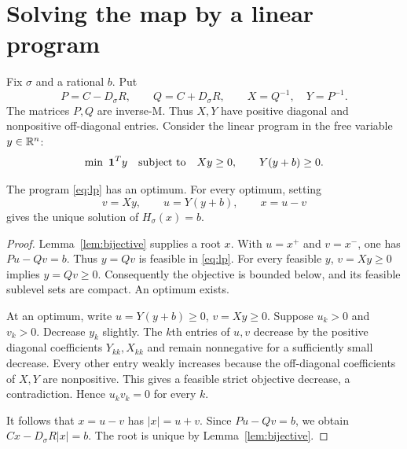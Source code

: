 \section{Solving the map by a linear program}
Fix $\sigma$ and a rational $b$. Put
\[
 P=C-D_\sigma R,\qquad Q=C+D_\sigma R,
 \qquad X=Q^{-1},\quad Y=P^{-1}.
\]
The matrices $P,Q$ are inverse-M. Thus $X,Y$ have positive diagonal and nonpositive off-diagonal entries. Consider the linear program in the free variable $y\in\mathbb R^n$:
\begin{equation}\label{eq:lp}
 \min\ \mathbf 1^Ty
 \quad\text{subject to}\quad Xy\ge0,\qquad Y(y+b)\ge0.
\end{equation}
\begin{lemma}\label{lem:lp}
The program \eqref{eq:lp} has an optimum. For every optimum, setting
\[
 v=Xy,\qquad u=Y(y+b),\qquad x=u-v
\]
gives the unique solution of $H_\sigma(x)=b$.
\end{lemma}
\begin{proof}
Lemma~\ref{lem:bijective} supplies a root $x$. With $u=x^+$ and $v=x^-$, one has $Pu-Qv=b$. Thus $y=Qv$ is feasible in \eqref{eq:lp}. For every feasible $y$, $v=Xy\ge0$ implies $y=Qv\ge0$. Consequently the objective is bounded below, and its feasible sublevel sets are compact. An optimum exists.

At an optimum, write $u=Y(y+b)\ge0$, $v=Xy\ge0$. Suppose $u_k>0$ and $v_k>0$. Decrease $y_k$ slightly. The $k$th entries of $u,v$ decrease by the positive diagonal coefficients $Y_{kk},X_{kk}$ and remain nonnegative for a sufficiently small decrease. Every other entry weakly increases because the off-diagonal coefficients of $X,Y$ are nonpositive. This gives a feasible strict objective decrease, a contradiction. Hence $u_kv_k=0$ for every $k$.

It follows that $x=u-v$ has $|x|=u+v$. Since $Pu-Qv=b$, we obtain $Cx-D_\sigma R|x|=b$. The root is unique by Lemma~\ref{lem:bijective}.
\end{proof}
